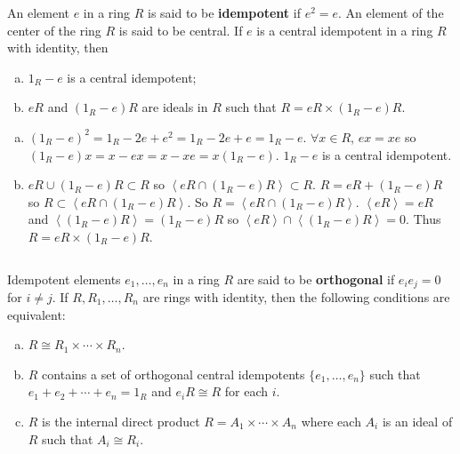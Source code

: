$$ $$

\begin{ex}
    An element $e$ in a ring $R$ is said to be \textbf{idempotent} if $e^{2}=e$. An element  of the center of the ring $R$ is said to be central. If $e$ is a central idempotent in a ring $R$ with identity, then
    \begin{enumerate}[(a)]
        \item $1_{R}-e$ is a central idempotent;
        \item $eR$ and $(1_{R}-e)R$ are ideals in $R$ such that $R=eR\times (1_{R}-e)R$.
    \end{enumerate}
\end{ex}

\begin{answer}
    \begin{enumerate}[(a)]
        \item $(1_{R}-e)^{2}=1_{R}-2e+e^{2}=1_{R}-2e+e=1_{R}-e$. $\forall x\in R$, $ex=xe$ so $(1_{R}-e)x=x-ex=x-xe=x(1_{R}-e)$. $1_{R}-e$ is a central idempotent.
        \item $eR\cup (1_{R}-e)R\subset R$ so $\left\langle eR\cap(1_{R}-e)R\right\rangle\subset R$. $R=eR+(1_{R}-e)R$ so $R\subset\left\langle eR\cap(1_{R}-e)R\right\rangle$. So $R=\left\langle eR\cap(1_{R}-e)R\right\rangle$. $\left\langle eR\right\rangle=eR$ and $\left\langle (1_{R}-e)R\right\rangle=(1_{R}-e)R$ so $\left\langle eR\right\rangle\cap \left\langle (1_{R}-e)R\right\rangle=0$. Thus $R=eR\times (1_{R}-e)R$.
    \end{enumerate}
\end{answer}

$$ $$

\begin{ex}
    Idempotent elements $e_{1},\dots,e_{n}$ in a ring $R$ are said to be \textbf{orthogonal} if $e_{i}e_{j}=0$ for $i\neq j$. If $R,R_{1},\dots, R_{n}$ are rings with identity, then the following conditions are equivalent:
    \begin{enumerate}[(a)]
        \item $R\cong R_{1}\times \cdots\times R_{n}$.
        \item $R$ contains a set of orthogonal central idempotents $\{e_{1}, \dots, e_{n}\}$ such that $e_{1}+e_{2}+\cdots+e_{n}=1_{R}$ and $e_{i}R\cong R$ for each $i$.
        \item $R$ is the internal direct product $R=A_{1}\times \cdots\times A_{n}$ where each $A_{i}$ is an ideal of $R$ such that $A_{i}\cong R_{i}$.
    \end{enumerate}
\end{ex}

